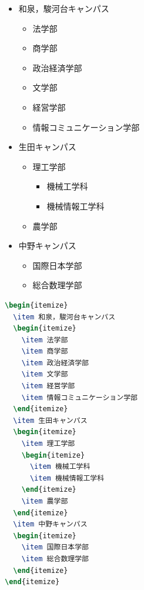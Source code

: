 \documentclass[
    paper=a4paper,      %
    article,            %
    fontsize=11pt,      %
    jafontsize=11pt,    %
    head_space=25mm,    %
    foot_space=25mm,    %
    gutter=20mm,        %
    fore-edge=20mm      %
    ]{jlreq}            %
\begin{document}
\begin{multicols}{2}
  \begin{itemize}
    \item 和泉，駿河台キャンパス
    \begin{itemize}
      \item 法学部
      \item 商学部
      \item 政治経済学部
      \item 文学部
      \item 経営学部
      \item 情報コミュニケーション学部
    \end{itemize}
    \item 生田キャンパス
    \begin{itemize}
      \item 理工学部
      \begin{itemize}
        \item 機械工学科
        \item 機械情報工学科
      \end{itemize}
      \item 農学部
    \end{itemize}
    \item 中野キャンパス
    \begin{itemize}
      \item 国際日本学部
      \item 総合数理学部
    \end{itemize}
  \end{itemize}
  \columnbreak
\begin{lstlisting}[language=TeX]
\begin{itemize}
  \item 和泉，駿河台キャンパス
  \begin{itemize}
    \item 法学部
    \item 商学部
    \item 政治経済学部
    \item 文学部
    \item 経営学部
    \item 情報コミュニケーション学部
  \end{itemize}
  \item 生田キャンパス
  \begin{itemize}
    \item 理工学部
    \begin{itemize}
      \item 機械工学科
      \item 機械情報工学科
    \end{itemize}
    \item 農学部
  \end{itemize}
  \item 中野キャンパス
  \begin{itemize}
    \item 国際日本学部
    \item 総合数理学部
  \end{itemize}
\end{itemize}
\end{lstlisting}
\end{multicols}
\end{document}
